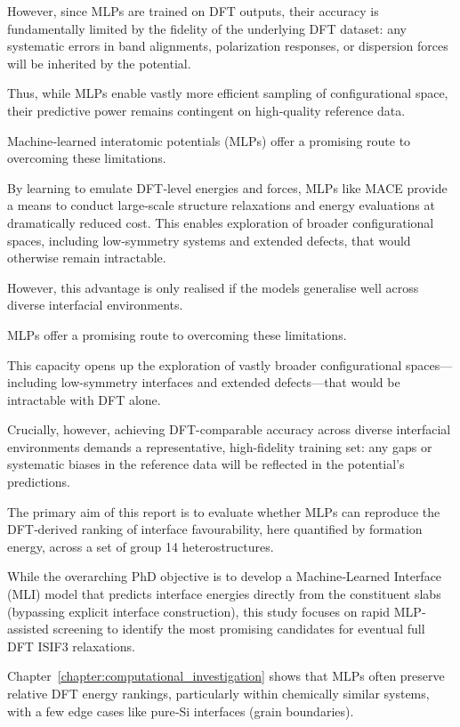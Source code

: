 However, since MLPs are trained on DFT outputs, their accuracy is fundamentally limited by the fidelity of the
underlying DFT dataset: any systematic errors in band alignments, polarization responses, or dispersion forces will be
inherited by the potential.

Thus, while MLPs enable vastly more efficient sampling of configurational space, their predictive power remains
contingent on high‐quality reference data.

\label{para:mlp_overview} %

Machine‐learned interatomic potentials (MLPs) offer a promising route to overcoming these limitations.

By learning to emulate DFT‐level energies and forces, MLPs like MACE provide a means to conduct large‐scale structure
relaxations and energy evaluations at dramatically reduced cost. This enables exploration of broader configurational
spaces, including low‐symmetry systems and extended defects, that would otherwise remain intractable.

However, this advantage is only realised if the models generalise well across diverse interfacial environments.

MLPs offer a promising route to overcoming these limitations.

This capacity opens up the exploration of vastly broader configurational spaces—including low-symmetry interfaces and
extended defects—that would be intractable with DFT alone.

Crucially, however, achieving DFT-comparable accuracy across diverse interfacial environments demands a representative,
high-fidelity training set: any gaps or systematic biases in the reference data will be reflected in the potential’s
predictions.


\label{para:motivation_mlp_dft} %

The primary aim of this report is to evaluate whether MLPs can reproduce the DFT‐derived ranking of interface
favourability, here quantified by formation energy, across a set of group 14 heterostructures.

While the overarching PhD objective is to develop a Machine‐Learned Interface (MLI) model that predicts interface
energies directly from the constituent slabs (bypassing explicit interface construction), this study focuses on rapid
MLP‐assisted screening to identify the most promising candidates for eventual full DFT ISIF3 relaxations.

Chapter~\ref{chapter:computational_investigation} shows that MLPs often preserve relative DFT energy rankings,
particularly within chemically similar systems, with a few edge cases like pure‐Si interfaces (grain boundaries).

